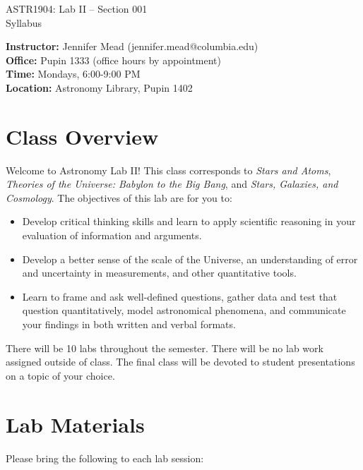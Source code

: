 \documentclass[11pt]{article}
\begin{document}
\begin{center}
\LARGE{ASTR1904: Lab II -- Section 001} \\ \medskip \Large{Syllabus}\\ 
\end{center}

\noindent
\textbf{Instructor:} Jennifer Mead (jennifer.mead@columbia.edu)\\
\textbf{Office:} Pupin 1333 (office hours by appointment)\\ 
\textbf{Time:} {Mondays, 6:00-9:00 PM} \\
\textbf{Location:} {Astronomy Library, Pupin 1402} \\

\section*{Class Overview}
Welcome to Astronomy Lab II! This class corresponds to \textit{Stars and Atoms}, \textit{Theories of the Universe: Babylon to the Big Bang}, and \textit{Stars, Galaxies, and Cosmology}.  The objectives of this lab are for you to:
\begin{itemize}
\item Develop critical thinking skills and learn to apply scientific reasoning in your evaluation of information and arguments. 
\item Develop a better sense of the scale of the Universe, an understanding of error and uncertainty in measurements, and other quantitative tools.
\item Learn to frame and ask well-defined questions, gather data and test that question quantitatively, model astronomical phenomena, and communicate your findings in both written and verbal formats.
\end{itemize}

\bigskip
 
\noindent There will be 10 labs throughout the semester.  There will be no lab work assigned outside of class. The final class will be devoted to student presentations on a topic of your choice.
 
\section*{Lab Materials}
 
Please bring the following to each lab session:
 
\end{document}
